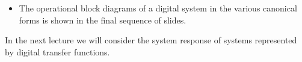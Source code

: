 \begin{itemize}
	\item The operational block diagrams of a digital system
	in the various canonical forms is shown in the final sequence of
	slides.
\end{itemize}
\begin{slide}\label{slide:l9s14}
\end{slide}

\begin{slide}\label{slide:l9s15}
\end{slide}

\begin{slide}\label{slide:l9s16}
\end{slide}

In the next lecture we will consider the system response of
systems represented by digital transfer functions.
